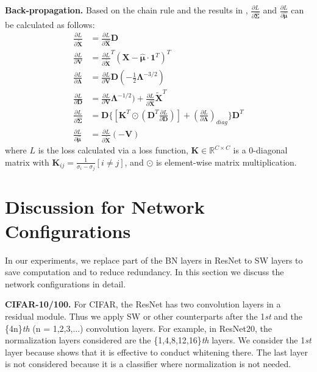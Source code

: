 \documentclass[10pt,twocolumn,letterpaper]{article}
\begin{document}
\noindent\textbf{Back-propagation.}
Based on the chain rule and the results in \cite{ionescu2015training,lei2018decorrelated}, $\frac{\partial L}{\partial \bm{\hat{\Sigma}}}$ and $\frac{\partial L}{\partial \bm{\hat{\mu}}}$ can be calculated as follows:
\begin{align}
\frac{\partial L}{\partial \mathbf{\tilde{X}}} &= \frac{\partial L}{\partial \mathbf{\hat{X}}} \mathbf{D}	\\
\frac{\partial L}{\partial \mathbf{V}} &= \frac{\partial L}{\partial \mathbf{\tilde{X}}}^{T} (\mathbf{X} - \hat{\bm{\mu}} \cdot \mathbf{1}^T)^T	\\
\frac{\partial L}{\partial \bm{\Lambda}} &= \frac{\partial L}{\partial \mathbf{V}} \mathbf{D} (-\frac{1}{2} \bm{\Lambda}^{-3/2})	\\
\frac{\partial L}{\partial \mathbf{D}} &= \frac{\partial L}{\partial \mathbf{V}} \bm{\Lambda}^{-1/2}) + \frac{\partial L}{\partial \mathbf{\hat{X}}} \mathbf{\tilde{X}}^T	\\
\frac{\partial L}{\partial \bm{\hat{\Sigma}}} &= \mathbf{D} \{[\mathbf{K}^T \odot (\mathbf{D}^T \frac{\partial L}{\partial \mathbf{D}})] + (\frac{\partial L}{\partial \bm{\Lambda}})_{diag} \} \mathbf{D}^T		\\
\frac{\partial L}{\partial \bm{\hat{\mu}}} &= \frac{\partial L}{\partial \mathbf{\tilde{X}}} (-\mathbf{V})
\end{align}
where $L$ is the loss calculated via a loss function, $\mathbf{K} \in \mathbb{R}^{C \times C}$ is a 0-diagonal matrix with $\mathbf{K}_{ij} = \frac{1}{\sigma_i - \sigma_j} [i \neq j]$, and $\odot$ is element-wise matrix multiplication.


\section{Discussion for Network Configurations}

In our experiments, we replace part of the BN layers in ResNet to SW layers to save computation and to reduce redundancy.
In this section we discuss the network configurations in detail.

\noindent\textbf{CIFAR-10/100.}
For CIFAR, the ResNet has two convolution layers in a residual module. 
Thus we apply SW or other counterparts after the 1\textit{st} and the \{4n\}\textit{th} (n = 1,2,3,...) convolution layers.
For example, in ResNet20, the normalization layers considered are the \{1,4,8,12,16\}\textit{th} layers.
We consider the 1\textit{st} layer because \cite{lei2018decorrelated} shows that it is effective to conduct whitening there.
The last layer is not considered because it is a classifier where normalization is not needed.
\end{document}
